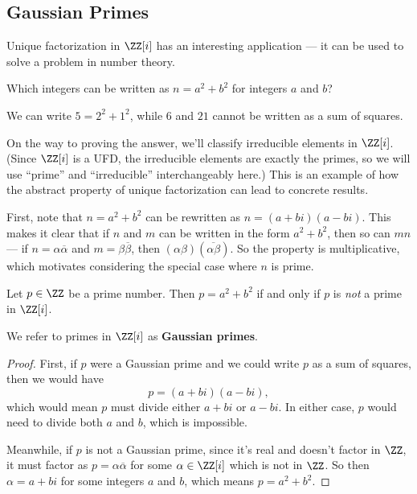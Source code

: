 \subsection{Gaussian Primes}

Unique factorization in $\ZZ[i]$ has an interesting application --- it can be used to solve a problem in number theory. 

\begin{qq}
Which integers can be written as $n = a^2 + b^2$ for integers $a$ and $b$?
\end{qq}

\begin{example}
    We can write $5 = 2^2 + 1^2$, while $6$ and $21$ cannot be written as a sum of squares. 
\end{example}

On the way to proving the answer, we'll classify irreducible elements in $\ZZ[i]$. (Since $\ZZ[i]$ is a UFD, the irreducible elements are exactly the primes, so we will use ``prime'' and ``irreducible'' interchangeably here.) This is an example of how the abstract property of unique factorization can lead to concrete results. 

First, note that $n = a^2 + b^2$ can be rewritten as $n = (a + bi)(a - bi)$. This makes it clear that if $n$ and $m$ can be written in the form $a^2 + b^2$, then so can $mn$ --- if $n = \alpha\overline{\alpha}$ and $m = \beta\overline{\beta}$, then $(\alpha\beta)(\overline{\alpha\beta})$. So the property is multiplicative, which motivates considering the special case where $n$ is prime.  

\begin{lemma}
Let $p \in \ZZ$ be a prime number. Then $p = a^2 + b^2$ if and only if $p$ is \emph{not} a prime in $\ZZ[i]$.
\end{lemma}

We refer to primes in $\ZZ[i]$ as \textbf{Gaussian primes}.

\begin{proof}
First, if $p$ were a Gaussian prime and we could write $p$ as a sum of squares, then we would have \[p = (a + bi)(a - bi),\] which would mean $p$ must divide either $a + bi$ or $a - bi$. In either case, $p$ would need to divide both $a$ and $b$, which is impossible. 

Meanwhile, if $p$ is not a Gaussian prime, since it's real and doesn't factor in $\ZZ$, it must factor as $p = \alpha\overline{\alpha}$ for some $\alpha \in \ZZ[i]$ which is not in $\ZZ$. So then $\alpha = a + bi$ for some integers $a$ and $b$, which means $p = a^2 + b^2$. 
\end{proof}

